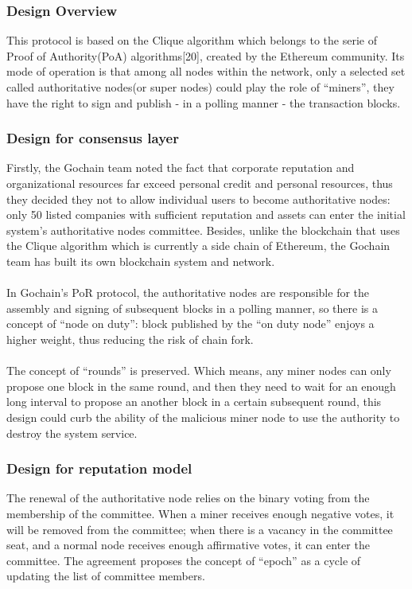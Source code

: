 \documentclass[]{article}
\begin{document}
\begin{CJK*}{UTF8}{gbsn}
	\subsubsection*{Design Overview} 
	 This protocol is based on the Clique algorithm which belongs to the serie of Proof of Authority(PoA) algorithms[20], created by the Ethereum community. Its mode of operation is that among all nodes within the network, only a selected set called authoritative nodes(or super nodes) could play the role of ``miners'', they have the right to sign and publish - in a polling manner - the transaction blocks.
	\subsubsection*{Design for consensus layer}  
	Firstly, the Gochain team noted the fact that corporate reputation and organizational resources far exceed personal credit and personal resources, thus they decided they not to allow individual users to become authoritative nodes: only 50 listed companies with sufficient reputation and assets can enter the initial system’s authoritative nodes committee. Besides, unlike the blockchain that uses the Clique algorithm which is currently a side chain of Ethereum, the Gochain team has built its own blockchain system and network.
	\paragraph{} 
	In Gochain's PoR protocol, the authoritative nodes are responsible for the assembly and signing of subsequent blocks in a polling manner, so there is a concept of ``node on duty'': block published by the ``on duty node'' enjoys a higher weight,
thus reducing the risk of chain fork.
	\paragraph{}	
	The concept of ``rounds'' is preserved. Which means, any miner nodes can only propose one block in the same round, and then they need to wait for an enough long interval to propose an another block in a certain subsequent round, this design could curb the ability of the malicious miner node to use the authority to destroy the system service.
	\subsubsection*{Design for reputation model}  
	The renewal of the authoritative node relies on the binary voting from the membership of  the committee. When a miner receives enough negative votes, it will be removed from the committee; when there is a vacancy in the committee seat, and a normal node receives enough affirmative votes, it can enter the committee. The agreement proposes the concept of ``epoch'' as a cycle of updating the list of committee members.

\end{CJK*}
\end{document}
